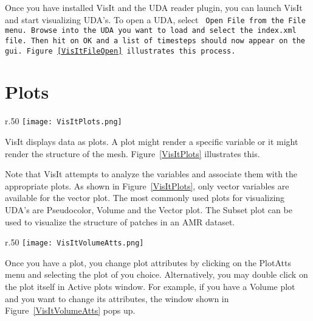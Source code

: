Once you have installed VisIt and the UDA reader plugin, you can
launch VisIt and start visualizing UDA's. To open a UDA, select \tt
Open File \normalfont from the \tt File \normalfont menu. Browse into
the UDA you want to load and select the \tt index.xml \normalfont
file. Then hit on \tt OK \normalfont and a list of timesteps should
now appear on the gui. Figure~\ref{VisItFileOpen} illustrates this
process.


\section{Plots}

\begin{wrapfigure}{r}{.50\textwidth}
  \vspace{-65pt}
  \center
  \texttt{[image: VisItPlots.png]}
  \vspace{-10pt}
  \caption{Various plots in VisIt}
  \vspace{-50pt}
  \label{VisItPlots}
\end{wrapfigure}


VisIt displays data as plots. A plot might render a specific variable
or it might render the structure of the mesh. Figure~\ref{VisItPlots}
illustrates this.


Note that VisIt attempts to analyze the variables and associate them
with the appropriate plots. As shown in Figure~\ref{VisItPlots}, only
vector variables are available for the vector plot. The most commonly
used plots for visualizing UDA's are Pseudocolor, Volume and the
Vector plot. The Subset plot can be used to visualize the structure of
patches in an AMR dataset.

\begin{wrapfigure}{r}{.50\textwidth}
  \vspace{-20pt}
  \center
  \texttt{[image: VisItVolumeAtts.png]}
  \vspace{-10pt}
  \caption{Volume plot attributes in VisIt}
  \vspace{-40pt}
  \label{VisItVolumeAtts}
\end{wrapfigure}


Once you have a plot, you change plot attributes by clicking on the
PlotAtts menu and selecting the plot of you choice. Alternatively, you
may double click on the plot itself in Active plots window. For
example, if you have a Volume plot and you want to change its
attributes, the window shown in Figure~\ref{VisItVolumeAtts} pops up.



